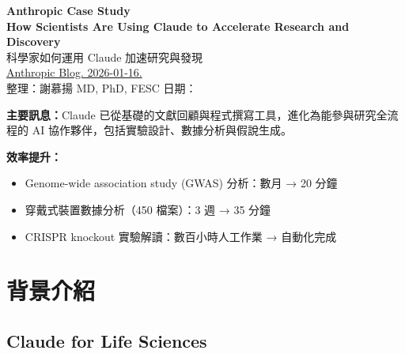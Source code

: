 \documentclass[12pt,a4paper]{article}
\begin{document}

\begin{center}
{\LARGE\bfseries\textcolor{emergency_red}{Anthropic Case Study}}\\[0.5cm]
{\Large\textbf{How Scientists Are Using Claude to Accelerate Research and Discovery}}\\[0.3cm]
{\large 科學家如何運用 Claude 加速研究與發現}\\[0.5cm]
{\normalsize \href{https://www.anthropic.com/news/accelerating-scientific-research}{Anthropic Blog. 2026-01-16.}}\\[0.3cm]
{\normalsize 整理：謝慕揚 MD, PhD, FESC \quad 日期：\mydate}
\end{center}

\vspace{0.5cm}


\begin{tcolorbox}[colback=yellow!10!white,colframe=orange!75!black,title=\textbf{核心重點摘要}]
\textbf{主要訊息：}Claude 已從基礎的文獻回顧與程式撰寫工具，進化為能參與研究全流程的 AI 協作夥伴，包括實驗設計、數據分析與假說生成。

\textbf{效率提升：}
\begin{itemize}[nosep]
    \item Genome-wide association study (GWAS) 分析：數月 → 20 分鐘
    \item 穿戴式裝置數據分析（450 檔案）：3 週 → 35 分鐘
    \item CRISPR knockout 實驗解讀：數百小時人工作業 → 自動化完成
\end{itemize}
\end{tcolorbox}

\tableofcontents
\newpage

\section{背景介紹}

\subsection{Claude for Life Sciences}
\end{document}
